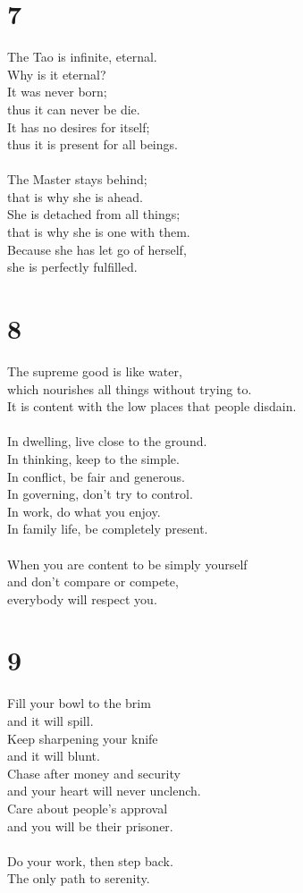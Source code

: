 \documentclass[b5paper, 12pt, oneside]{book}
\begin{document}
\chapter*{7}
The Tao is infinite, eternal.\\
Why is it eternal?\\
It was never born;\\
thus it can never be die.\\
It has no desires for itself;\\
thus it is present for all beings.\\
\\
The Master stays behind;\\
that is why she is ahead.\\
She is detached from all things;\\
that is why she is one with them.\\
Because she has let go of herself,\\
she is perfectly fulfilled.\\

\chapter*{8}
The supreme good is like water,\\
which nourishes all things without trying to.\\
It is content with the low places that people disdain.\\
\\
In dwelling, live close to the ground.\\
In thinking, keep to the simple.\\
In conflict, be fair and generous.\\
In governing, don't try to control.\\
In work, do what you enjoy.\\
In family life, be completely present.\\
\\
When you are content to be simply yourself\\
and don't compare or compete,\\
everybody will respect you.

\chapter*{9}
Fill your bowl to the brim\\
and it will spill.\\
Keep sharpening your knife\\
and it will blunt.\\
Chase after money and security\\
and your heart will never unclench.\\
Care about people's approval\\
and you will be their prisoner.\\
\\
Do your work, then step back.\\
The only path to serenity.\\
\end{document}
